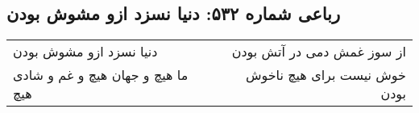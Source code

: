 \begin{center}
\section*{رباعی شماره ۵۳۲: دنیا نسزد ازو مشوش بودن}
\label{sec:sh532}
\begin{longtable}{l p{0.5cm} r}
دنیا نسزد ازو مشوش بودن
&&
از سوز غمش دمی در آتش بودن
\\
ما هیچ و جهان هیچ و غم و شادی هیچ
&&
خوش نیست برای هیچ ناخوش بودن
\\
\end{longtable}
\end{center}
